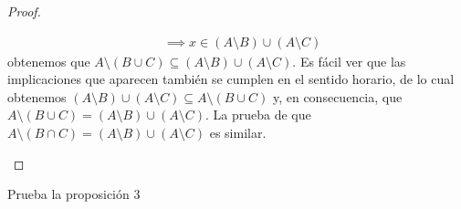 \documentclass[12pt,a4paper]{book}
\begin{document}
\begin{proof}
\begin{enumerate}
\begin{align*}
                &\implies x\in (A\setminus B)\cup(A\setminus C)
            \end{align*}
            obtenemos que $A\setminus(B\cup C)\subseteq(A\setminus B)\cup(A\setminus C)$. Es fácil ver que las implicaciones
            que aparecen también se cumplen en el sentido horario, de lo cual obtenemos $(A\setminus B)\cup(A\setminus C)\subseteq A\setminus(B\cup C)$
            y, en consecuencia, que $A\setminus(B\cup C)=(A\setminus B)\cup(A\setminus C)$. La prueba de que $A\setminus(B\cap C)=(A\setminus B)\cup(A\setminus C)$
            es similar.
        \end{enumerate}
    \end{proof}

    \begin{ejercicio}
        Prueba la proposición 3
    \end{ejercicio}
\end{document}
